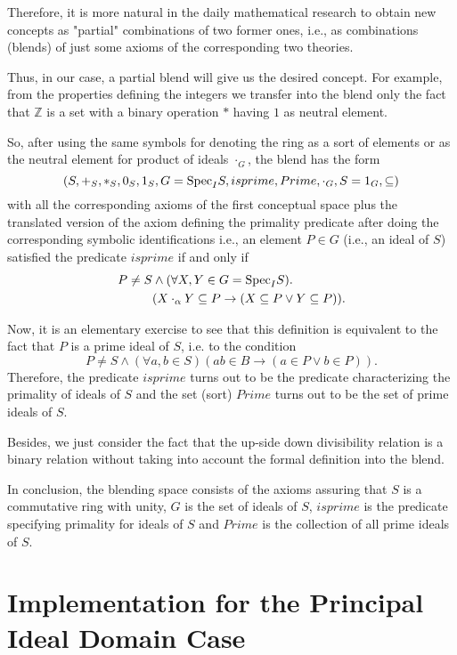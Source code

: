 Therefore, it is more natural in the daily mathematical research to obtain new concepts as "partial" combinations of two former ones, i.e., as combinations (blends) of just some axioms of the corresponding two theories.
 
Thus, in our case, a partial blend will give us the desired concept. For example, from the properties defining the integers we transfer into the blend only the fact that $\mathbb{Z}$ is a set with a binary operation $*$ having $1$ as neutral element. 

So, after using the same symbols for denoting the ring as a sort of elements or as the neutral element for product of ideals $\cdot_G$, the blend has the form
\[(S, +_S, *_S, 0_S, 1_S, G={\rm Spec}_IS, isprime, Prime, \cdot_G,
S=1_G, \subseteq)\] with all the corresponding axioms of the first
conceptual space plus the translated version of the axiom defining the
primality predicate after doing the corresponding symbolic
identifications i.e., an element $P \in G$ (i.e., an ideal of $S$)
satisfied the predicate $isprime$ if and only if
\begin{align*}
P\neq S & \wedge (\forall X,Y\in G={\rm Spec}_IS). \\
        & (X\cdot_{\alpha}Y\subseteq P \rightarrow (X\subseteq P \vee Y\subseteq P)).
\end{align*}

Now, it is an elementary exercise to see that this definition is
equivalent to the fact that $P$ is a prime ideal of $S$, i.e. to the
condition
\[ P\neq S \wedge (\forall a,b\in S)(ab\in B\rightarrow (a\in P \vee
b\in P)).\] Therefore, the predicate $isprime$ turns out to be the
predicate characterizing the primality of ideals of $S$ and the set
(sort) $Prime$ turns out to be the set of prime ideals of $S$.

Besides, we just consider the fact that the up-side down divisibility
relation is a binary relation without taking into account the formal
definition into the blend.

In conclusion, the blending space consists of the axioms assuring that
$S$ is a commutative ring with unity, $G$ is the set of ideals of $S$,
$isprime$ is the predicate specifying primality for ideals of $S$ and
$Prime$ is the collection of all prime ideals of $S$.
 
\section{Implementation for the Principal Ideal Domain Case}

